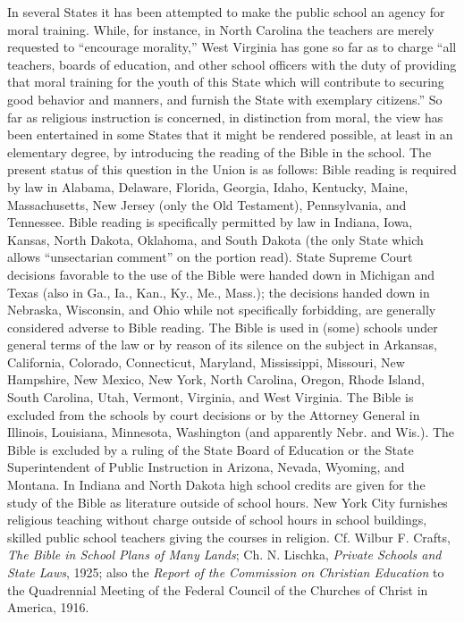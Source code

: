 In several States it has been attempted to make the public school an agency for moral training. While, for instance, in North Carolina the teachers are merely requested to “encourage morality,” West Virginia has gone so far as to charge “all teachers, boards of education, and other school officers with the duty of providing that moral training for the youth of this State which will contribute to securing good behavior and manners, and furnish the State with exemplary citizens.” So far as religious instruction is concerned, in distinction from moral, the view has been entertained in some States that it might be rendered possible, at least in an elementary
degree, by introducing the reading of the Bible in the school. The present status of this question in the Union is as follows: Bible reading is required by law in Alabama, Delaware, Florida, Georgia, Idaho, Kentucky, Maine, Massachusetts, New Jersey (only the Old Testament), Pennsylvania, and Tennessee. Bible reading is specifically permitted by law in Indiana, Iowa, Kansas, North Dakota, Oklahoma, and South Dakota (the only State which allows “unsectarian comment” on the portion read). State Supreme Court decisions favorable to the use of the Bible were handed down in Michigan and Texas (also in Ga., Ia., Kan., Ky., Me., Mass.); the decisions handed down in Nebraska, Wisconsin, and Ohio while not specifically forbidding, are generally considered adverse to Bible reading. The Bible is used in (some) schools under general terms of the law or by reason of its silence on the subject in Arkansas, California, Colorado, Connecticut, Maryland, Mississippi, Missouri, New Hampshire, New Mexico, New York, North Carolina, Oregon, Rhode Island, South Carolina, Utah, Vermont, Virginia, and West Virginia. The Bible is excluded from the schools by court decisions or by the Attorney General in Illinois, Louisiana, Minnesota, Washington (and apparently Nebr. and Wis.). The Bible is excluded by a ruling of the State Board of Education or the State Superintendent of Public Instruction in Arizona, Nevada, Wyoming, and Montana. In Indiana and North Dakota high school credits are given for the study of the Bible as literature outside of school hours. New York City furnishes religious teaching without charge outside of school hours in school buildings, skilled public school teachers giving the courses in religion. Cf. Wilbur F. Crafts, \emph{The Bible in School Plans of Many Lands}; Ch. N. Lischka, \emph{Private Schools and State Laws}, 1925; also the \emph{Report of the Commission on Christian Education} to the Quadrennial Meeting of the Federal Council of the Churches of Christ in America, 1916.

